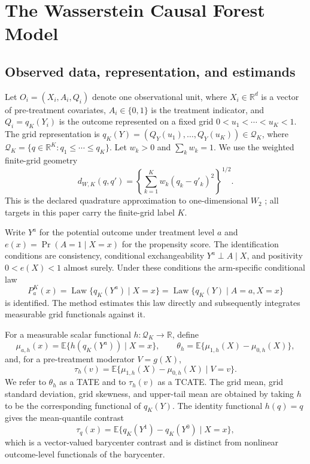 
\section{The Wasserstein Causal Forest Model}\label{sec:model}

\subsection{Observed data, representation, and estimands}\label{sec:setup}

Let $O_i=(X_i,A_i,Q_i)$ denote one observational unit, where $X_i\in
\mathbb{R}^{d}$ is a vector of pre-treatment covariates, $A_i\in\{0,1\}$ is
the treatment indicator, and $Q_i=q_K(Y_i)$ is the outcome represented on a
fixed grid $0<u_1<\cdots<u_K<1$. The grid representation is
$q_K(Y)=(Q_Y(u_1),\ldots,Q_Y(u_K))\in\mathcal{Q}_K$, where
$\mathcal{Q}_K=\{q\in\mathbb{R}^K:q_1\leq\cdots\leq q_K\}$. Let
$w_k>0$ and $\sum_k w_k=1$. We use the weighted finite-grid geometry
\[
 d_{W,K}(q,q')=\left\{\sum_{k=1}^{K}w_k(q_k-q'_k)^2\right\}^{1/2}.
\]
This is the declared quadrature approximation to one-dimensional $W_2$
\citep{peyre2019optimaltransport}; all
targets in this paper carry the finite-grid label $K$.

Write $Y^a$ for the potential outcome under treatment level $a$ and
$e(x)=\Pr(A=1\mid X=x)$ for the propensity score. The identification
conditions are consistency, conditional exchangeability
$Y^a\perp A\mid X$, and positivity $0<e(X)<1$ almost surely. Under these
conditions the arm-specific conditional law
\[
 P_a^K(x)=\operatorname{Law}\{q_K(Y^a)\mid X=x\}
 =\operatorname{Law}\{q_K(Y)\mid A=a,X=x\}
\]
is identified. The method estimates this law directly and subsequently
integrates measurable grid functionals against it.

For a measurable scalar functional $h:\mathcal{Q}_K\to\mathbb{R}$, define
\[
 \mu_{a,h}(x)=\mathbb{E}\{h(q_K(Y^a))\mid X=x\},\qquad
 \theta_h=\mathbb{E}\{\mu_{1,h}(X)-\mu_{0,h}(X)\},
\]
and, for a pre-treatment moderator $V=g(X)$,
\[
 \tau_h(v)=\mathbb{E}\{\mu_{1,h}(X)-\mu_{0,h}(X)\mid V=v\}.
\]
We refer to $\theta_h$ as a TATE and to $\tau_h(v)$ as a TCATE. The grid
mean, grid standard deviation, grid skewness, and upper-tail mean are obtained
by taking $h$ to be the corresponding functional of $q_K(Y)$. The identity
functional $h(q)=q$ gives the mean-quantile contrast
\[
 \tau_q(x)=\mathbb{E}\{q_K(Y^1)-q_K(Y^0)\mid X=x\},
\]
which is a vector-valued barycenter contrast and is distinct from nonlinear
outcome-level functionals of the barycenter.


